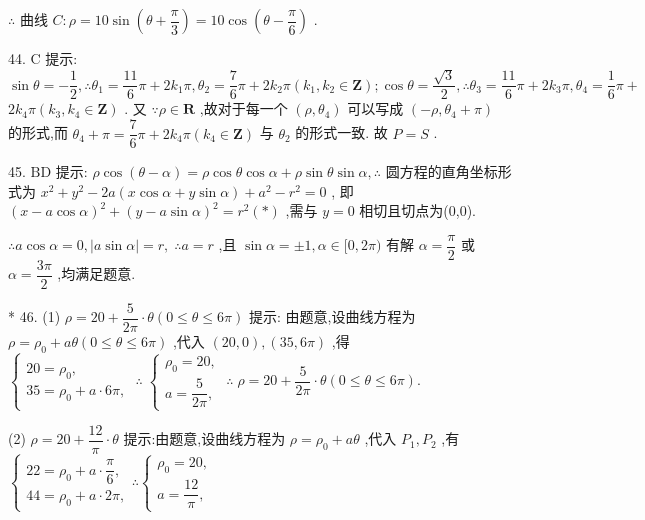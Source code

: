 $\therefore$ 曲线 $C : \rho  = {10}\sin \left( {\theta  + \dfrac{\pi }{3}}\right)  = {10}\cos \left( {\theta  - \dfrac{\pi }{6}}\right)$ .

44. C 提示: $\sin \theta  =  - \dfrac{1}{2},\therefore {\theta }_{1} = \dfrac{11}{6}\pi  + 2{k}_{1}\pi ,{\theta }_{2} = \dfrac{7}{6}\pi  + 2{k}_{2}\pi \left( {{k}_{1},{k}_{2} \in  \mathbf{Z}}\right) ;\cos \theta  = \dfrac{\sqrt{3}}{2},\therefore {\theta }_{3} = \dfrac{11}{6}\pi  + 2{k}_{3}\pi ,{\theta }_{4} = \dfrac{1}{6}\pi  +$  $2{k}_{4}\pi \left( {{k}_{3},{k}_{4} \in  \mathbf{Z}}\right)$ . 又 $\because \rho  \in  \mathbf{R}$ ,故对于每一个 $\left( {\rho ,{\theta }_{4}}\right)$ 可以写成 $\left( {-\rho ,{\theta }_{4} + \pi }\right)$ 的形式,而 ${\theta }_{4} + \pi  = \dfrac{7}{6}\pi  + 2{k}_{4}\pi \left( {{k}_{4} \in  \mathbf{Z}}\right)$ 与 ${\theta }_{2}$ 的形式一致. 故 $P = S$ .

45. $\mathrm{{BD}}$ 提示: $\rho \cos \left( {\theta  - \alpha }\right)  = \rho \cos \theta \cos \alpha  + \rho \sin \theta \sin \alpha ,\therefore$ 圆方程的直角坐标形式为 ${x}^{2} + {y}^{2} - {2a}\left( {x\cos \alpha  + y\sin \alpha }\right)  + {a}^{2} - {r}^{2} = 0$ , 即 ${\left( x - a\cos \alpha \right) }^{2} + {\left( y - a\sin \alpha \right) }^{2} = {r}^{2}\left( *\right)$ ,需与 $y = 0$ 相切且切点为(0,0).

$\therefore a\cos \alpha  = 0,\left| {a\sin \alpha }\right|  = r,\;\therefore a = r$ ,且 $\sin \alpha  =  \pm  1,\alpha  \in  \lbrack 0,{2\pi })$ 有解 $\alpha  = \dfrac{\pi }{2}$ 或 $\alpha  = \dfrac{3\pi }{2}$ ,均满足题意.

* 46. (1) $\rho  = {20} + \dfrac{5}{2\pi } \cdot  \theta \left( {0 \leq  \theta  \leq  {6\pi }}\right)$ 提示: 由题意,设曲线方程为 $\rho  = {\rho }_{0} + {a\theta }\left( {0 \leq  \theta  \leq  {6\pi }}\right)$ ,代入 $\left( {{20},0}\right) ,\left( {{35},{6\pi }}\right)$ ,得 $\left\{  {\begin{array}{l} {20} = {\rho }_{0}, \\  {35} = {\rho }_{0} + a \cdot  {6\pi }, \end{array}\;\therefore \;\left\{  {\begin{array}{l} {\rho }_{0} = {20}, \\  a = \dfrac{5}{2\pi }, \end{array}\;\therefore \;\rho  = {20} + \dfrac{5}{2\pi } \cdot  \theta \left( {0 \leq  \theta  \leq  {6\pi }}\right) .}\right. }\right.$

(2) $\rho  = {20} + \dfrac{12}{\pi } \cdot  \theta$ 提示:由题意,设曲线方程为 $\rho  = {\rho }_{0} + {a\theta }$ ,代入 ${P}_{1},{P}_{2}$ ,有 $\left\{  {\begin{array}{l} {22} = {\rho }_{0} + a \cdot  \dfrac{\pi }{6}, \\  {44} = {\rho }_{0} + a \cdot  {2\pi }, \end{array}\therefore \left\{  \begin{array}{l} {\rho }_{0} = {20}, \\  a = \dfrac{12}{\pi }, \end{array}\right. }\right.$

